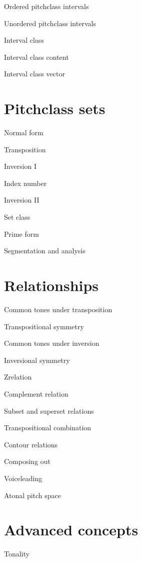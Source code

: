 \documentclass[letterpaper,10pt,english]{sphinxmanual}
\begin{document}
\sphinxAtStartPar
Ordered pitch\sphinxhyphen{}class intervals

\sphinxAtStartPar
Unordered pitch\sphinxhyphen{}class intervals

\sphinxAtStartPar
Interval class

\sphinxAtStartPar
Interval class content

\sphinxAtStartPar
Interval class vector


\section{Pitch\sphinxhyphen{}class sets}
\label{\detokenize{3_set_theory:pitch-class-sets}}
\sphinxAtStartPar
Normal form

\sphinxAtStartPar
Transposition

\sphinxAtStartPar
Inversion I

\sphinxAtStartPar
Index number

\sphinxAtStartPar
Inversion II

\sphinxAtStartPar
Set class

\sphinxAtStartPar
Prime form

\sphinxAtStartPar
Segmentation and analysis


\section{Relationships}
\label{\detokenize{3_set_theory:relationships}}
\sphinxAtStartPar
Common tones under transposition

\sphinxAtStartPar
Transpositional symmetry

\sphinxAtStartPar
Common tones under inversion

\sphinxAtStartPar
Inversional symmetry

\sphinxAtStartPar
Z\sphinxhyphen{}relation

\sphinxAtStartPar
Complement relation

\sphinxAtStartPar
Subset and superset relations

\sphinxAtStartPar
Transpositional combination

\sphinxAtStartPar
Contour relations

\sphinxAtStartPar
Composing out

\sphinxAtStartPar
Voice\sphinxhyphen{}leading

\sphinxAtStartPar
Atonal pitch space


\section{Advanced concepts}
\label{\detokenize{3_set_theory:advanced-concepts}}
\sphinxAtStartPar
Tonality
\end{document}
